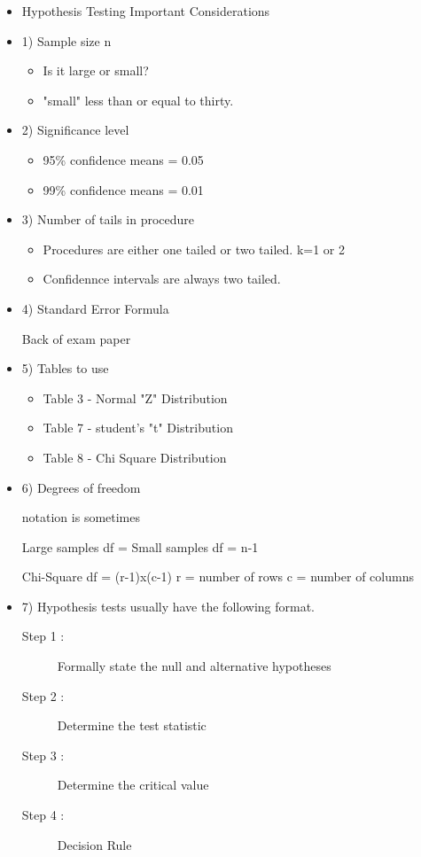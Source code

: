 \documentclass[]{report}
\begin{document}
{{{%

\begin{itemize}
\item Hypothesis Testing 
Important Considerations

\item1) Sample size n

\begin{itemize}
\item Is it large or small?       
\item "small" less than or equal to thirty.
\end{itemize}


\item2) Significance level 
\begin{itemize}
\item 95\% confidence means = 0.05
\item 99\% confidence means = 0.01
\end{itemize}


\item3) Number of tails in procedure
\begin{itemize}
\item Procedures are either one tailed or two tailed.  k=1 or 2
\item Confidennce intervals are always two tailed.
\end{itemize}


\item4) Standard Error Formula

Back of exam paper

\item5) Tables to use
\begin{itemize}
\item Table 3 - Normal "Z" Distribution
\item Table 7 - student's "t" Distribution
\item Table 8 - Chi Square Distribution
\end{itemize}


\item6) Degrees of freedom

notation is sometimes 

Large samples    df = 
Small samples    df = n-1

Chi-Square        df = (r-1)x(c-1)
r  = number of rows
c =  number of columns

\item7) Hypothesis tests usually have the following format.

\begin{description}
\item[Step 1 :] Formally state the null and alternative hypotheses
\item[Step 2 :] Determine the test statistic
\item[Step 3 :] Determine the critical value
\item[Step 4 :] Decision Rule
\end{description}



\end{itemize}}}}
\end{document}
